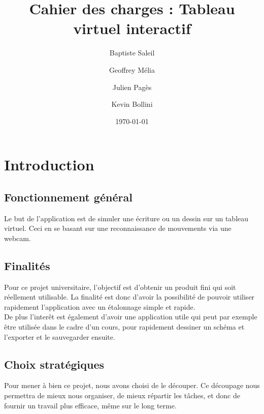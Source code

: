 \documentclass{article}
\title{Cahier des charges : Tableau virtuel interactif}
\author{Baptiste Saleil \and Geoffrey Mélia \and Julien Pagès \and Kevin Bollini}
\date{\today}
\begin{document}
	\maketitle
	\thispagestyle{empty}
	\newpage
	
	\tableofcontents
	\newpage
	
	\section{Introduction}
		\subsection{Fonctionnement général}
			Le but de l'application est de simuler une écriture ou un dessin sur un tableau virtuel. Ceci en se basant 
		sur une reconnaissance de mouvements via une webcam.
		\subsection{Finalités}
			Pour ce projet universitaire, l'objectif est d'obtenir un produit fini qui soit réellement utilisable.
La finalité est donc d'avoir la possibilité de pouvoir utiliser rapidement l'application avec un étalonnage simple et rapide.\\
De plus l'interêt est également d'avoir une application utile qui peut par exemple être utilisée dans le cadre d'un cours,
pour rapidement dessiner un schéma et l'exporter et le sauvegarder ensuite. \\
\subsection{Choix stratégiques}
			Pour mener à bien ce projet, nous avons choisi de le découper.
			Ce découpage nous permettra de mieux nous organiser, de mieux répartir les tâches, et donc de fournir un travail plus efficace, même sur le long terme.
\end{document}
